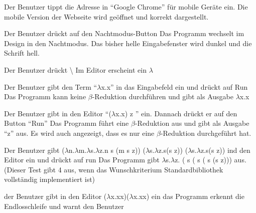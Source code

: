 \documentclass[parskip=full,11pt,twoside]{scrartcl}
\begin{document}
{Der Benutzer tippt die Adresse in \enquote{Google Chrome} für mobile Geräte ein.}
{Die mobile Version der Webseite wird geöffnet und korrekt dargestellt.}

{Der Benutzer drückt auf den Nachtmodus-Button}
{Das Programm wechselt im Design in den Nachtmodus. Das bisher helle Eingabefenster wird dunkel und die Schrift hell.}





{ Der Benutzer drückt \textbackslash }
{Im Editor erscheint ein $\lambda$}

{Der Benutzer gibt den Term \enquote {$\lambda$x.x} in das Eingabefeld ein und drückt auf Run}
{Das Programm kann keine $\beta$-Reduktion durchführen und gibt als Ausgabe $\lambda$x.x}

{ Der Benutzer gibt in den Editor \enquote {($\lambda$x.x) z } ein. Dannach drückt er auf den Button \enquote {Run}}
{ Das Programm führt eine $\beta$-Reduktion aus und gibt als Ausgabe \enquote {z} aus. Es wird auch angezeigt, dass es nur eine $\beta$-Reduktion durchgeführt hat.}

{Der Benutzer gibt \newline ($\lambda$n.$\lambda$m.$\lambda$s.$\lambda$z.n s (m s z)) ($\lambda$s.$\lambda$z.s(s z)) ($\lambda$s.$\lambda$z.s(s z)) ind den Editor ein und drückt auf run}
{Das Programm gibt $\lambda$s.$\lambda$z. ( s ( s ( s (s z))) aus. (Dieser Test gibt 4 aus, wenn das Wunschkriterium Standardbibliothek vollständig implementiert ist) }

{der Benutzer gibt in den Editor ($\lambda$x.xx)($\lambda$x.xx) ein }
{ das Programm erkennt die Endlosschleife und warnt den Benutzer }
\end{document}
